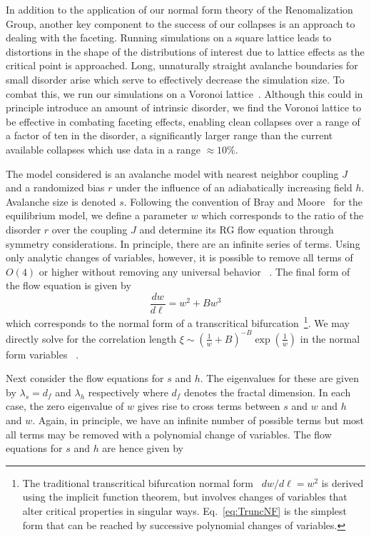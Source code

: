 \documentclass[reprint,amsmath,amssymb,aps,floatfix]{revtex4-1}
\begin{document}
%
In addition to the application of our normal form theory of the Renomalization Group, another key component to the success of our collapses is an approach to dealing with the faceting. Running simulations on a square lattice leads to distortions in the shape of the distributions of interest due to lattice effects as the critical point is approached. Long, unnaturally straight avalanche boundaries for small disorder arise which serve to effectively decrease the simulation size. To combat this, we run our simulations on a Voronoi lattice~\cite[Section~\ref{supp-app:sims}]{RFIM2Dsupp}.  Although this could in principle introduce an amount of intrinsic disorder, we find the Voronoi lattice to be effective in combating faceting effects, enabling clean collapses over a range of a factor of ten in the disorder, a significantly larger range than the current available collapses which use data in a range $\approx 10\%$.\par
%
The model considered is an avalanche model with nearest neighbor coupling $J$ and a randomized bias $r$ under the influence of an adiabatically increasing field $h$. Avalanche size is denoted $s$. Following the convention of Bray and Moore~\cite{BrayMoore85} for the equilibrium model, we define a parameter $w$ which corresponds to the ratio of the disorder $r$ over the coupling $J$ and determine its RG flow equation through symmetry considerations. In principle, there are an infinite series of terms. Using only analytic changes of variables, however, it is possible to remove all terms of $O(4)$ or higher without removing any universal behavior ~\cite[Section~\ref{supp-app:normalform}]{RFIM2Dsupp}. The final form of the flow equation is given by 
%
\begin{equation}
	\label{eq:TruncNF}
	\frac{dw}{d\ell}=w^2+B w^3
\end{equation}
\noindent which corresponds to the normal form of a transcritical bifurcation~\footnote{The traditional transcritical bifurcation normal form~\cite{Strogatz14} $dw/d\ell = w^2$ is derived using the implicit function theorem, but involves changes of variables that alter critical properties in singular ways. Eq.~\ref{eq:TruncNF} is the simplest form that can be reached by successive polynomial changes of variables.}. We may directly solve for the correlation length $\xi\sim(\frac{1}{w}+B)^{-B}\exp(\frac{1}{w})$ in the normal form variables ~\cite[Section~\ref{supp-app:correlation}]{RFIM2Dsupp}.\par
%
Next consider the flow equations for $s$ and $h$. The eigenvalues for these are given by $\lambda_s=d_f$ and $\lambda_h$ respectively where $d_f$ denotes the fractal dimension. In each case, the zero eigenvalue of $w$ gives rise to cross terms between $s$ and $w$ and $h$ and $w$. Again, in principle, we have an infinite number of possible terms but most all terms may be removed with a polynomial change of variables.   The flow equations for $s$ and $h$ are hence given by
\end{document}
